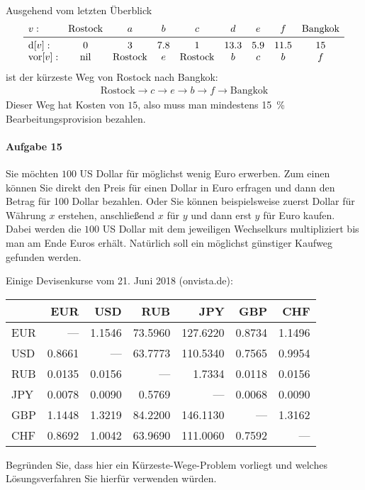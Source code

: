 \documentclass[
a4paper, %
11pt,
]
{scrartcl}
\newcommand{\dist}{\text{d}}
\newcommand{\vor}{\text{vor}}
\newcommand{\nil}{\text{nil}}
\begin{document}
Ausgehend vom letzten Überblick
\begin{align*}
  \begin{array}{lcccccccc}
    v: & \text{Rostock} & a & b & c & d & e & f & \text{Bangkok}\\
    \midrule
    \dist[v]:
      & 0 & 3 & \num{7,8} & 1 & \num{13,3} & \num{5,9} & \num{11,5} & \num{15}\\
    \vor[v]:
      & \nil & \text{Rostock} & e & \text{Rostock} & b & c & b & f
  \end{array}
\end{align*}
ist der kürzeste Weg von Rostock nach Bangkok:
\begin{align*}
  \text{Rostock}
    \rightarrow c
    \rightarrow e
    \rightarrow b
    \rightarrow f
    \rightarrow \text{Bangkok}
\end{align*}
Dieser Weg hat Kosten von $15$, also muss man mindestens \SI{15}{\percent}
Bearbeitungsprovision bezahlen.

\paragraph{Aufgabe 15}%
\label{par:aufgabe_15}

Sie möchten $100$ US Dollar für möglichst wenig Euro erwerben. Zum einen können
Sie direkt den Preis für einen Dollar in Euro erfragen und dann den Betrag für
100 Dollar bezahlen. Oder Sie können beispielsweise zuerst Dollar für Währung
$x$ erstehen, anschließend $x$ für $y$ und dann erst $y$ für Euro kaufen. Dabei
werden die $100$ US Dollar mit dem jeweiligen Wechselkurs multipliziert bis man
am Ende Euros erhält. Natürlich soll ein möglichst günstiger Kaufweg gefunden
werden.

Einige Devisenkurse vom 21. Juni 2018 (onvista.de):
\begin{center}
  \begin{tabular}{lrrrrrr}
    \toprule
             & EUR          & USD          & RUB           & JPY            & GBP          & CHF\\
    \midrule
    EUR      & —            & \num{1,1546} & \num{73,5960} & \num{127,6220} & \num{0,8734} & \num{1,1496}\\
    USD      & \num{0,8661} & —            & \num{63,7773} & \num{110,5340} & \num{0,7565} & \num{0,9954}\\
    RUB      & \num{0,0135} & \num{0,0156} & —             & \num{1,7334}   & \num{0,0118} & \num{0,0156}\\
    JPY      & \num{0,0078} & \num{0,0090} & \num{0,5769}  & —              & \num{0,0068} & \num{0,0090}\\
    GBP      & \num{1,1448} & \num{1,3219} & \num{84,2200} & \num{146,1130} & —            & \num{1,3162}\\
    CHF      & \num{0,8692} & \num{1,0042} & \num{63,9690} & \num{111,0060} & \num{0,7592} & —\\
    \bottomrule
  \end{tabular}
\end{center}
Begründen Sie, dass hier ein Kürzeste-Wege-Problem vorliegt und welches
Lösungsverfahren Sie hierfür verwenden würden.
\end{document}

